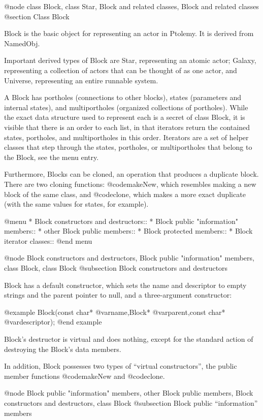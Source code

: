 @node class Block, class Star, Block and related classes, Block and related classes
@section Class Block

Block is the basic object for representing an actor in Ptolemy.
It is derived from NamedObj.

Important derived types of Block are Star, representing an atomic actor;
Galaxy, representing a collection of actors that can be thought of as
one actor, and Universe, representing an entire runnable system.

A Block has portholes (connections to other blocks), states (parameters
and internal states), and multiportholes (organized collections of
portholes).  While the exact data structure used to represent each is a
secret of class Block, it is visible that there is an order to each list, in
that iterators return the contained states, portholes, and
multiportholes in this order.  Iterators are a set of helper classes
that step through the states, portholes, or multiportholes that belong
to the Block, see the menu entry.

Furthermore, Blocks can be cloned, an operation that produces a
duplicate block.  There are two cloning functions: @code{makeNew},
which resembles making a new block of the same class, and @code{clone},
which makes a more exact duplicate (with the same values for states,
for example).

@menu
* Block constructors and destructors::
* Block public "information" members::
* other Block public members::
* Block protected members::
* Block iterator classes::
@end menu

@node Block constructors and destructors, Block public "information" members, class Block, class Block
@subsection Block constructors and destructors

Block has a default constructor, which sets the name and
descriptor to empty strings and the parent pointer to null, and a
three-argument constructor:

@example
Block(const char* @var{name},Block* @var{parent},const char* @var{descriptor});
@end example

Block's destructor is virtual and does nothing, except for the standard
action of destroying the Block's data members.

In addition, Block possesses two types of ``virtual constructors'', the
public member functions @code{makeNew} and @code{clone}.

@node Block public "information" members, other Block public members, Block constructors and destructors, class Block
@subsection Block public ``information'' members


